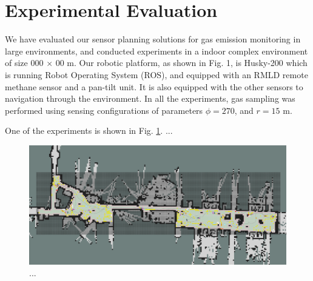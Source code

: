 \section{Experimental Evaluation}

We have evaluated our sensor planning solutions for gas emission monitoring in large environments, and conducted experiments in a indoor complex environment of size 000 $\times$ 00 m. Our robotic platform, as shown in Fig. 1, is Husky-200 which is running Robot Operating System (ROS), and equipped with an RMLD remote methane sensor and a pan-tilt unit. It is also equipped with the other sensors to navigation through the environment. In all the experiments, gas sampling was performed using sensing configurations of parameters $\phi = 270$\dg, and $r = 15$ m. 

One of the experiments is shown in Fig. \ref{fig:exp}. ... 

\begin{figure}[h!]
	\centering
	\includegraphics[trim={35 160 25 150}, clip,width=1\linewidth,angle=0]{fig/5-10-1se.png}
	\caption{...}
	\label{fig:exp}
\end{figure}




